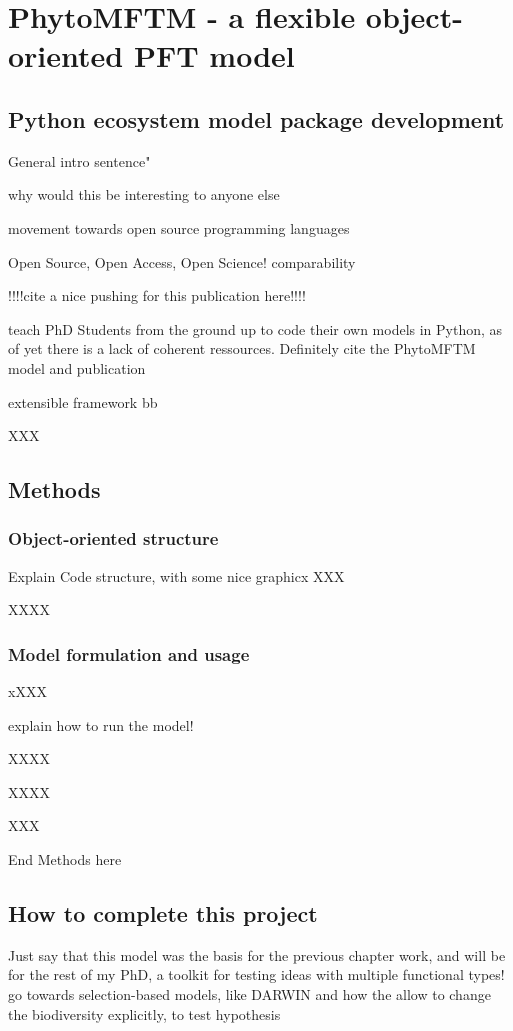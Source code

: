 \chapter{PhytoMFTM - a flexible object-oriented PFT model}

\small {\textbf{}}


\normalsize
\section{Python ecosystem model package development}
General intro sentence" 

why would this be interesting to anyone else


movement towards open source programming languages

Open Source, Open Access, Open Science!
comparability

!!!!cite a nice pushing for this publication here!!!!

teach PhD Students from the ground up to code their own models in Python, as of yet there is a lack of coherent ressources. Definitely cite the PhytoMFTM model and publication \citep{AcevedoTrejos2016}

extensible framework
bb



XXX

\section{Methods}



\subsection{Object-oriented structure}
Explain Code structure, with some nice graphicx
XXX

XXXX

\subsection{Model formulation and usage}
xXXX

explain how to run the model!

XXXX

XXXX

XXX


End Methods here

\section{How to complete this project}


Just say that this model was the basis for the previous chapter work, and will be for the rest of my PhD, a toolkit for testing ideas with multiple functional types! go towards selection-based models, like DARWIN
and how the allow to change the biodiversity explicitly, to test hypothesis

